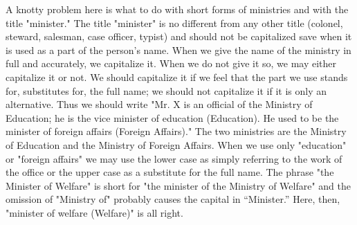 \documentclass[
    oneside,
    11pt,
    draft
]{memoir}
\begin{document}
A knotty problem here is what to do with short forms of ministries and with the title "minister." The title "minister" is no different from any other title (colonel, steward, salesman, case officer, typist) and should not be capitalized save when it is used as a part of the person's name. When we give the name of the ministry in full and accurately, we capitalize it. When we do not give it so, we may either capitalize it or not. We should capitalize it if we feel that the part we use stands for, substitutes for, the full name; we should not capitalize it if it is only an alternative. Thus we should write "Mr. X is an official of the Ministry of Education; he is the vice minister of education (Education). He used to be the minister of foreign affairs (Foreign Affairs)." The two ministries are the Ministry of Education and the Ministry of Foreign Affairs. When we use only "education" or "foreign affairs" we may use the lower case as simply referring to the work of the office or the upper case as a substitute for the full name. The phrase "the Minister of Welfare" is short for "the minister of the Ministry of Welfare" and the omission of "Ministry of" probably causes the capital in \enquote{Minister.} Here, then, "minister of welfare (Welfare)" is all right. 
\end{document}
